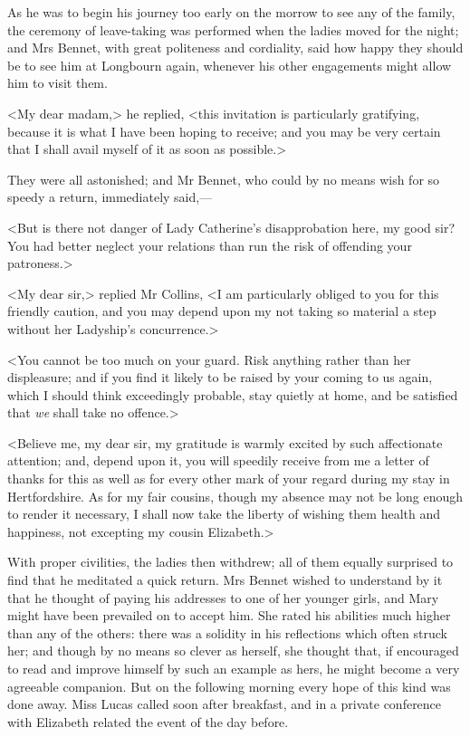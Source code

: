 As he was to begin his journey too early on the morrow to see any of the family, the ceremony of leave-taking was performed when the ladies moved for the night; and Mrs Bennet, with great politeness and cordiality, said how happy they should be to see him at Longbourn again, whenever his other engagements might allow him to visit them.

<My dear madam,> he replied, <this invitation is particularly gratifying, because it is what I have been hoping to receive; and you may be very certain that I shall avail myself of it as soon as possible.>

They were all astonished; and Mr Bennet, who could by no means wish for so speedy a return, immediately said,—

<But is there not danger of Lady Catherine's disapprobation here, my good sir? You had better neglect your relations than run the risk of offending your patroness.>

<My dear sir,> replied Mr Collins, <I am particularly obliged to you for this friendly caution, and you may depend upon my not taking so material a step without her Ladyship's concurrence.>

<You cannot be too much on your guard. Risk anything rather than her displeasure; and if you find it likely to be raised by your coming to us again, which I should think exceedingly probable, stay quietly at home, and be satisfied that \textit{we} shall take no offence.>

<Believe me, my dear sir, my gratitude is warmly excited by such affectionate attention; and, depend upon it, you will speedily receive from me a letter of thanks for this as well as for every other mark of your regard during my stay in Hertfordshire. As for my fair cousins, though my absence may not be long enough to render it necessary, I shall now take the liberty of wishing them health and happiness, not excepting my cousin Elizabeth.>

With proper civilities, the ladies then withdrew; all of them equally surprised to find that he meditated a quick return. Mrs Bennet wished to understand by it that he thought of paying his addresses to one of her younger girls, and Mary might have been prevailed on to accept him. She rated his abilities much higher than any of the others: there was a solidity in his reflections which often struck her; and though by no means so clever as herself, she thought that, if encouraged to read and improve himself by such an example as hers, he might become a very agreeable companion. But on the following morning every hope of this kind was done away. Miss Lucas called soon after breakfast, and in a private conference with Elizabeth related the event of the day before.

